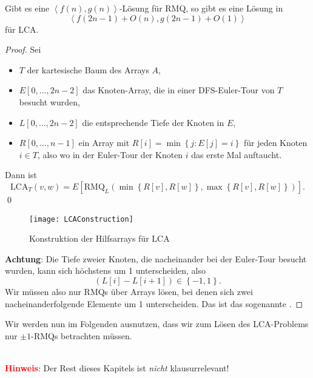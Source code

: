 \begin{lemma}
  Gibt es eine \( \left\langle f(n),g(n) \right\rangle \)-Lösung für RMQ, so gibt es eine Lösung in
  \begin{equation*}
    \left\langle f(2n-1)+O(n),g(2n-1)+O(1) \right\rangle
  \end{equation*}
  für LCA.
  \begin{proof}
    Sei
    \begin{itemize}
      \item \( T \) der kartesische Baum des Arrays \( A \),
      \item \( E[0,\dots,2n-2] \) das Knoten-Array, die in einer DFS-Euler-Tour von \( T \) besucht wurden,
      \item \( L[0,\dots,2n-2] \) die entsprechende Tiefe der Knoten in \( E \),
      \item \( R[0,\dots,n-1] \) ein Array mit \( R[i] = \min\left \{ j : E[j] = i \right \} \) für jeden Knoten \( i \in T \), also wo in der Euler-Tour der Knoten \( i \) das erste Mal auftaucht.
    \end{itemize}
    Dann ist
    \begin{equation*}
      \text{LCA}_T(v,w) = E[\text{RMQ}_L(\min\left \{ R[v],R[w] \right \}, \max\left \{ R[v],R[w] \right \})]\text{.}
    \end{equation*} \qed \\
    \begin{figure}[H]
      \texttt{[image: LCAConstruction]}
      \caption{Konstruktion der Hilfsarrays für LCA}
    \end{figure}
    \textcolor{red!80!black}{\textbf{Achtung}}: Die Tiefe zweier Knoten, die nacheinander bei der Euler-Tour besucht wurden, kann sich höchstens um 1 unterscheiden, also
    \begin{equation*}
      (L[i]-L[i+1]) \in \left \{ -1,1 \right \}\text{.}
    \end{equation*}
    Wir müssen also nur RMQs über Arrays lösen, bei denen sich zwei nacheinanderfolgende Elemente um 1 unterscheiden. Das ist das sogenannte .
  \end{proof}
\end{lemma}

Wir werden nun im Folgenden ausnutzen, dass wir zum Lösen des LCA-Problems nur \( \pm 1 \)-RMQs betrachten müssen. 

\ \\

\textbf{\textcolor{red}{Hinweis}}: Der Rest dieses Kapitels ist \emph{nicht} klausurrelevant!


